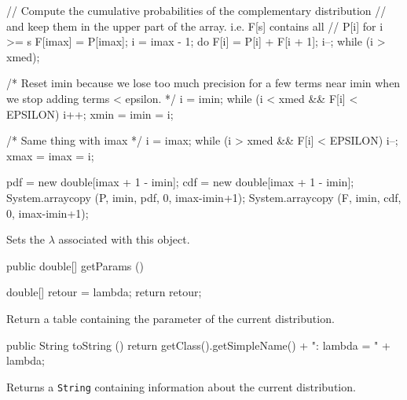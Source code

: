 \begin{code}
\begin{hide}
{      // Compute the cumulative probabilities of the complementary distribution
      // and keep them in the upper part of the array. i.e. F[s] contains all
      // P[i] for i >= s
      F[imax] = P[imax];
      i = imax - 1;
      do {
         F[i] = P[i] + F[i + 1];
         i--;
      } while (i > xmed);

       /* Reset imin because we lose too much precision for a few terms near
      imin when we stop adding terms < epsilon. */
      i = imin;
      while (i < xmed && F[i] < EPSILON)
         i++;
      xmin = imin = i;

      /* Same thing with imax */
      i = imax;
      while (i > xmed && F[i] < EPSILON)
         i--;
      xmax = imax = i;

      pdf = new double[imax + 1 - imin];
      cdf = new double[imax + 1 - imin];
      System.arraycopy (P, imin, pdf, 0, imax-imin+1);
      System.arraycopy (F, imin, cdf, 0, imax-imin+1);
   }\end{hide}
\end{code}
\begin{tabb}
   Sets the $\lambda$ associated with this object.
\end{tabb}
\begin{code}

   public double[] getParams ()\begin{hide} {
      double[] retour = {lambda};
      return retour;
   }\end{hide}
\end{code}
\begin{tabb}
   Return a table containing the parameter of the current distribution.
\end{tabb}
\begin{hide}\begin{code}

   public String toString () {
      return getClass().getSimpleName() + ": lambda = " + lambda;
   }
\end{code}
\begin{tabb}
   Returns a \texttt{String} containing information about the current distribution.
\end{tabb}\end{hide}
\begin{code}\begin{hide}
}\end{hide}
\end{code}
